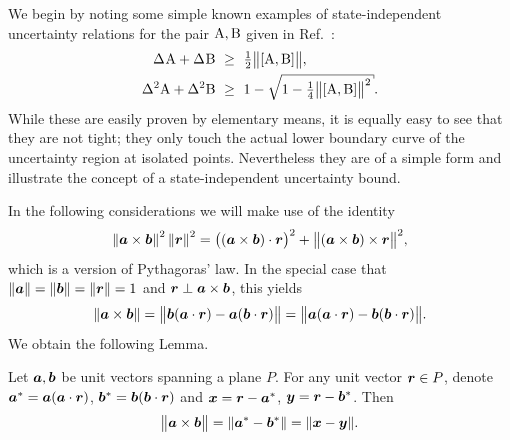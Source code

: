 We begin by noting some simple known examples of state-independent uncertainty relations for the pair $\operatorname{A},\operatorname{B}$ given in Ref.~\cite{BLW14}:
\begin{align}
  \label{eqn:straight-lower-bound-blw}
  \sdev{\opa}+\sdev{\opb}\ &\ge \ \tfrac12\bigl\|[\opa,\opb]\bigr\|,\\
  \label{eqn:curved-lower-bound-blw}
  \var{\opa}+\var{\opb}\ &\ge \ 1-\sqrt{1-\tfrac14\bigl\|[\opa,\opb]\bigr\|^2}.
\end{align}
While these are easily proven by elementary means, it is equally easy to see that they are not tight; they only touch the actual lower boundary curve of the uncertainty region at isolated points. Nevertheless they are of a simple form and illustrate the concept of a state-independent uncertainty bound.

In the following considerations we will make use of the identity
\begin{equation}\label{eq:r2-id}
  \left\|\bm{a}\times\bm{b}\right\|^2 \left\|\bm{r}\right\|^2 = \bigl((\bm{a}\times\bm{b})\cdot\bm{r}\bigr)^2 + \bigl\|(\bm{a}\times\bm{b})\times\bm{r}\bigr\|^2 ,
\end{equation}
which is a version of Pythagoras' law. In the special case that $\|\bm{a}\|=\|\bm{b}\|=\|\bm{r}\|=1$ and $\bm{r}\perp\bm{a}\times\bm{b}$, this yields
\begin{equation}
  \left\|\bm{a}\times\bm{b}\right\| = \bigl\|\bm{b}(\bm{a}\cdot\bm{r})-\bm{a}(\bm{b}\cdot\bm{r})\bigr\| = \bigl\|\bm{a}(\bm{a}\cdot\bm{r})-\bm{b}(\bm{b}\cdot\bm{r})\bigr\|.
\end{equation}
We obtain the following Lemma.
\begin{lem}
  Let $\bm{a},\bm{b}$ be unit vectors spanning a plane $P$. For any unit vector $\bm{r}\in P$, denote $\bm{a}^*=\bm{a}(\bm{a}\cdot\bm{r})$,  $\bm{b}^*=\bm{b}(\bm{b}\cdot\bm{r})$ and $\bm{x}=\bm{r}-\bm{a}^*$, $\bm{y}=\bm{r}-\bm{b}^*$. Then
  \begin{equation}\label{eq:axb}
    \bigl\|\bm{a}\times\bm{b}\bigr\| = \|\bm{a}^*-\bm{b}^*\|=\|\bm{x}-\bm{y}\|.
  \end{equation}
\end{lem}


